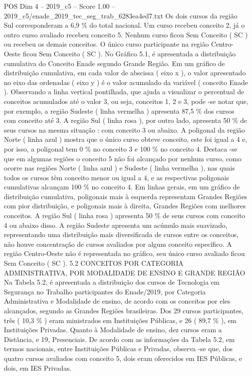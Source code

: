 \begin{textsample}{POS Dim 4 – 2019\_c5 – Score 1.00 – 2019\_c5/enade\_2019\_tec\_seg\_trab\_6283ea4ed7.txt}
Os dois cursos da região Sul corresponderam a 6,9 \% do total nacional.
Um curso recebeu conceito 2, já o outro curso avaliado recebeu conceito 5.
Nenhum curso ficou Sem Conceito ( SC ) ou recebeu os demais conceitos.
O único curso participante na região Centro-Oeste ficou Sem Conceito ( SC ).
No Gráfico 5.1, é apresentada a distribuição cumulativa do Conceito Enade segundo Grande Região.
Em um gráfico de distribuição cumulativa, em cada valor de abscissa ( eixo x ), o valor apresentado no eixo das ordenadas ( eixo y ) é o valor acumulado da variável ( conceito Enade ).
Observando a linha vertical pontilhada, que ajuda a visualizar o percentual de conceitos acumulados até o valor 3, ou seja, conceitos 1, 2 e 3, pode -se notar que, por exemplo, a região Sudeste ( linha vermelha ) apresenta 87,5 \% dos cursos com conceito até 3.
A região Sul ( linha rosa ), por outro lado, apresenta 50 \% de seus cursos na mesma situação : com conceito 3 ou abaixo.
A poligonal da região Norte ( linha azul ) mostra que o único curso obteve conceito, este foi igual a 4 e, por isso, a poligonal tem 0 \% no conceito 3 e 100 \% no conceito 4.
Destaca -se que em algumas regiões o conceito 5 não foi alcançado por nenhum curso, como ocorre nas regiões Norte ( linha azul ) e Sudeste ( linha vermelha ), nas quais todos os cursos têm conceito menor ou igual a 4, e as respectivas poligonais cumulativas alcançam 100 \% no conceito 4.
Em linhas gerais, em um gráfico de distribuição cumulativa, poligonais mais à esquerda representam Grandes Regiões com pior distribuição, e poligonais mais à direita, Grandes Regiões com melhores conceitos.
A região Sul ( linha rosa ) apresenta 50 \% de seus cursos com conceito 4 ou abaixo disso.
A região Sudeste apresenta um acúmulo mais suavizado, representando uma distribuição mais diversificada de cursos entre os conceitos, não houve concentração de cursos avaliados por algum conceito específico.
A região Centro-Oeste não é representada no gráfico, seu único curso avaliado ficou Sem Conceito ( SC ). 5.2 CONCEITOS POR CATEGORIA ADMINISTRATIVA, POR MODALIDADE DE ENSINO E GRANDE REGIÃO Na Tabela 5.2, é apresentada a distribuição dos cursos de Tecnologia em Segurança no Trabalho participantes do Enade/2019, por Categoria Administrativa e Modalidade de ensino, de acordo com os conceitos por eles alcançados, segundo as Grandes Regiões brasileiras.
Dos 29 cursos participantes, três ( 10,3 \% ) eram ministrados em Instituições Públicas, e 26 ( 89,7 \% ), em Instituições Privadas.
Quanto à Modalidade de ensino, dez cursos eram a Distância, e 19, Presenciais.
De acordo com as informações da Tabela 5.2, em termos nacionais, entre Instituições Públicas e Privadas, observa -se que, dos quatro cursos avaliados com conceito 5, dois eram oferecidos em IES Públicas, e dois, em IES Privadas.

\end{textsample}
